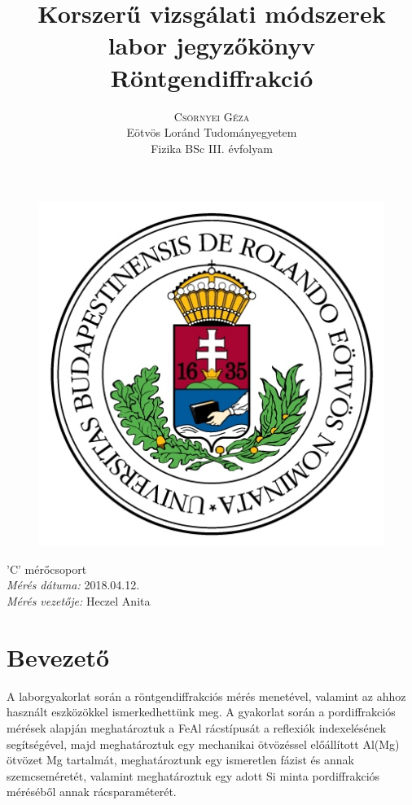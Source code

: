 \documentclass[12pt,a4paper]{article}
\title{\huge{Korszerű vizsgálati módszerek labor jegyzőkönyv}\\ \vspace{20pt}
\textbf{Röntgendiffrakció}}
\author{\Large{\textsc{Csörnyei Géza}} \vspace{10pt}\\
	\textrm{Eötvös Loránd Tudományegyetem}\\
	\textrm{Fizika BSc III. évfolyam}
	}
\date{}
\begin{document}
\addtolength{\voffset}{-1.0cm}
\addtolength{\textheight}{1.0cm}
\begin{titlepage}
\maketitle

\begin{figure}[!htb]
\centering
\includegraphics[scale=0.6]{eltecimer.jpg}
\end{figure}

\hfil \Large{'C' mérőcsoport}\hfil  \\
\vspace*{2pt}
\hfil \Large{\emph{Mérés dátuma:} 2018.04.12.}\hfil \\
\vspace*{2pt}
\hfil \hspace*{45pt} \Large{\emph{Mérés vezetője:} Heczel Anita}\hfil
\thispagestyle{empty}
\end{titlepage}

\section{Bevezető}
\hspace*{10pt} A laborgyakorlat során a röntgendiffrakciós mérés menetével, valamint az ahhoz használt eszközökkel ismerkedhettünk meg. A gyakorlat során a pordiffrakciós mérések alapján meghatároztuk a FeAl rácstípusát a reflexiók indexelésének segítségével,  majd meghatároztuk egy mechanikai ötvözéssel előállított Al(Mg) ötvözet Mg tartalmát, meghatároztunk egy ismeretlen fázist és annak szemcseméretét, valamint meghatároztuk egy adott Si minta pordiffrakciós méréséből annak rácsparaméterét.
\end{document}
